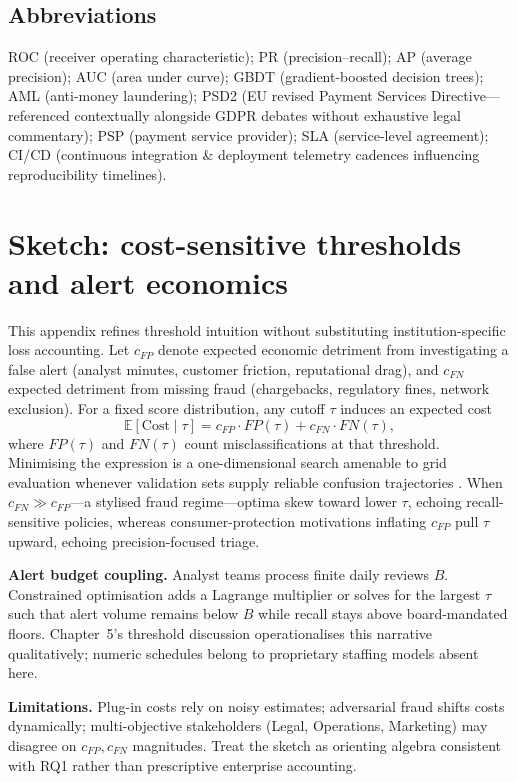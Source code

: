 \section*{Abbreviations}
ROC (receiver operating characteristic); PR (precision--recall); AP (average precision); AUC (area under curve); GBDT (gradient-boosted decision trees); AML (anti-money laundering); PSD2 (EU revised Payment Services Directive---referenced contextually alongside GDPR debates without exhaustive legal commentary); PSP (payment service provider); SLA (service-level agreement); CI/CD (continuous integration \& deployment telemetry cadences influencing reproducibility timelines).

\chapter{Sketch: cost-sensitive thresholds and alert economics}
This appendix refines threshold intuition without substituting institution-specific loss accounting. Let $c_{FP}$ denote expected economic detriment from investigating a false alert (analyst minutes, customer friction, reputational drag), and $c_{FN}$ expected detriment from missing fraud (chargebacks, regulatory fines, network exclusion). For a fixed score distribution, any cutoff $\tau$ induces an expected cost
\begin{equation}
\mathbb{E}[\text{Cost} \mid \tau]
= c_{FP}\cdot FP(\tau) + c_{FN}\cdot FN(\tau),
\end{equation}
where $FP(\tau)$ and $FN(\tau)$ count misclassifications at that threshold. Minimising the expression is a one-dimensional search amenable to grid evaluation whenever validation sets supply reliable confusion trajectories \cite{fraud_handbook}. When $c_{FN} \gg c_{FP}$—a stylised fraud regime—optima skew toward lower $\tau$, echoing recall-sensitive policies, whereas consumer-protection motivations inflating $c_{FP}$ pull $\tau$ upward, echoing precision-focused triage.

\textbf{Alert budget coupling.} Analyst teams process finite daily reviews $B$. Constrained optimisation adds a Lagrange multiplier or solves for the largest $\tau$ such that alert volume remains below $B$ while recall stays above board-mandated floors. Chapter~5's threshold discussion operationalises this narrative qualitatively; numeric schedules belong to proprietary staffing models absent here.

\textbf{Limitations.} Plug-in costs rely on noisy estimates; adversarial fraud shifts costs dynamically; multi-objective stakeholders (Legal, Operations, Marketing) may disagree on $c_{FP},c_{FN}$ magnitudes. Treat the sketch as orienting algebra consistent with RQ1 rather than prescriptive enterprise accounting.

